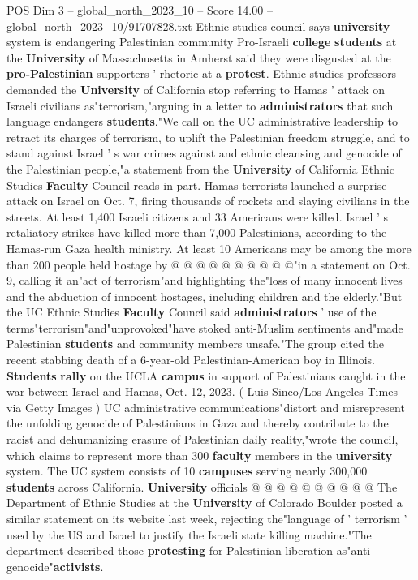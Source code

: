 \begin{textsample}{POS Dim 3 – global\_north\_2023\_10 – Score 14.00 – global\_north\_2023\_10/91707828.txt}  \label{ex:f3_pos_202}
Ethnic studies council says \textbf{university} system is endangering Palestinian community Pro-Israeli \textbf{college} \textbf{students} at the \textbf{University} of Massachusetts in Amherst said they were disgusted at the \textbf{pro-Palestinian} supporters ' rhetoric at a \textbf{protest}.
Ethnic studies professors demanded the \textbf{University} of California stop referring to Hamas ' attack on Israeli civilians as"terrorism,"arguing in a letter to \textbf{administrators} that such language endangers \textbf{students}."We call on the UC administrative leadership to retract its charges of terrorism, to uplift the Palestinian freedom struggle, and to stand against Israel ' s war crimes against and ethnic cleansing and genocide of the Palestinian people,"a statement from the \textbf{University} of California Ethnic Studies \textbf{Faculty} Council reads in part.
Hamas terrorists launched a surprise attack on Israel on Oct. 7, firing thousands of rockets and slaying civilians in the streets.
At least 1,400 Israeli citizens and 33 Americans were killed.
Israel ' s retaliatory strikes have killed more than 7,000 Palestinians, according to the Hamas-run Gaza health ministry.
At least 10 Americans may be among the more than 200 people held hostage by @ @ @ @ @ @ @ @ @ @"in a statement on Oct. 9, calling it an"act of terrorism"and highlighting the"loss of many innocent lives and the abduction of innocent hostages, including children and the elderly."But the UC Ethnic Studies \textbf{Faculty} Council said \textbf{administrators} ' use of the terms"terrorism"and"unprovoked"have stoked anti-Muslim sentiments and"made Palestinian \textbf{students} and community members unsafe."The group cited the recent stabbing death of a 6-year-old Palestinian-American boy in Illinois. \textbf{Students} \textbf{rally} on the UCLA \textbf{campus} in support of Palestinians caught in the war between Israel and Hamas, Oct. 12, 2023. ( Luis Sinco/Los Angeles Times via Getty Images ) UC administrative communications"distort and misrepresent the unfolding genocide of Palestinians in Gaza and thereby contribute to the racist and dehumanizing erasure of Palestinian daily reality,"wrote the council, which claims to represent more than 300 \textbf{faculty} members in the \textbf{university} system.
The UC system consists of 10 \textbf{campuses} serving nearly 300,000 \textbf{students} across California. \textbf{University} officials @ @ @ @ @ @ @ @ @ @ The Department of Ethnic Studies at the \textbf{University} of Colorado Boulder posted a similar statement on its website last week, rejecting the"language of ' terrorism ' used by the US and Israel to justify the Israeli state killing machine."The department described those \textbf{protesting} for Palestinian liberation as"anti-genocide"\textbf{activists}.

\end{textsample}
